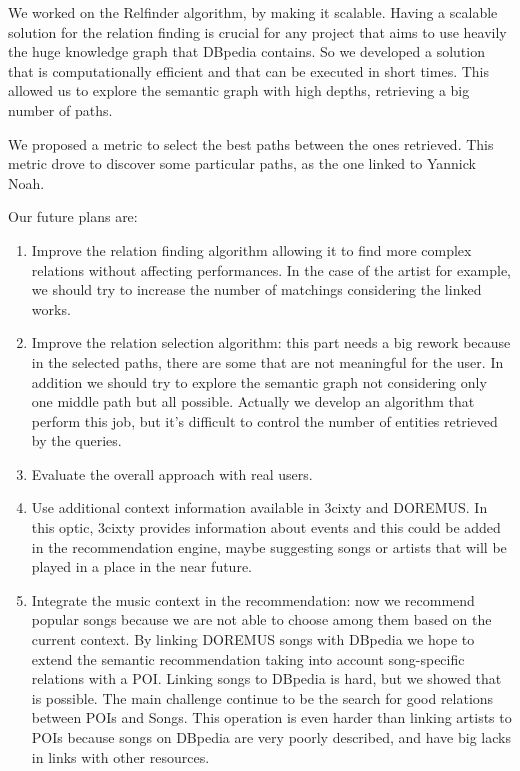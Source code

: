 \documentclass[paper=a4, fontsize=11pt]{scrartcl}
\begin{document}
We worked on the Relfinder algorithm, by making it scalable. Having a scalable solution for the relation finding is crucial for any project that aims to use heavily the huge knowledge graph that DBpedia contains. So we developed a solution that is computationally efficient and that can be executed in short times. This allowed us to explore the semantic graph with high depths, retrieving a big number of paths.

We proposed a metric to select the best paths between the ones retrieved. This metric drove to discover some particular paths, as the one linked to Yannick Noah.

Our future plans are:
\begin{enumerate}
\item Improve the relation finding algorithm allowing it to find more complex relations without affecting performances. In the case of the artist for example, we should try to increase the number of matchings considering the linked works.
\item Improve the relation selection algorithm: this part needs a big rework because in the selected paths, there are some that are not meaningful for the user. In addition we should try to explore the semantic graph not considering only one middle path but all possible. Actually we develop an algorithm that perform this job, but it's difficult to control the number of entities retrieved by the queries.
\item Evaluate the overall approach with real users.
\item Use additional context information available in 3cixty and DOREMUS. In this optic, 3cixty provides information about events and this could be added in the recommendation engine, maybe suggesting songs or artists that will be played in a place in the near future.
\item Integrate the music context in the recommendation: now we recommend popular songs because we are not able to choose among them based on the current context. By linking DOREMUS songs with DBpedia we hope to extend the semantic recommendation taking into account song-specific relations with a POI. Linking songs to DBpedia is hard, but we showed that is possible. The main challenge continue to be the search for good relations between POIs and Songs. This operation is even harder than linking artists to POIs because songs on DBpedia are very poorly described, and have big lacks in links with other resources.
\end{enumerate}


\end{document}
